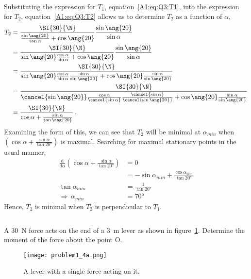 \documentclass[a4paper,justified,oneside]{tufte-handout}
\numberwithin{equation}{subsection}
\begin{document}
\begin{solution}
Substituting the expression for $T_1$, equation~\ref{A1:eq:Q3:T1}, into the expression for $T_2$, equation~\ref{A1:eq:Q3:T2} allows us to determine $T_2$ as a function of $\alpha$,
\begin{align}
	T_2	&=\frac{\SI{30}{\N}}{\frac{\sin\ang{20}}{\tan\alpha} + \cos\ang{20}}	\frac{\sin\ang{20}}{\sin\alpha}	\nonumber	\\
		&=\frac{\SI{30}{\N}}	{\sin\ang{20}\frac{\cos\alpha}{\sin\alpha} + \cos\ang{20}}	\frac{\sin\ang{20}}{\sin\alpha}	\nonumber \\
		&=\frac{\SI{30}{\N}}	{\sin\ang{20}\frac{\cos\alpha}{\sin\alpha}\frac{\sin\alpha}{\sin\ang{20}} + \cos\ang{20}\frac{\sin\alpha}{\sin\ang{20}}}	\nonumber \\
		&=\frac{\SI{30}{\N}}	{\cancel{\sin\ang{20}}	\frac{\cos\alpha}	{\cancel{\sin\alpha}}	\frac{\cancel{\sin\alpha}}{\cancel{\sin\ang{20}}} + \cos\ang{20}\frac{\sin\alpha}{\sin\ang{20}}}	\nonumber \\
		&=\frac{\SI{30}{\N}}{\cos\alpha + \frac{\sin\alpha}{\tan\ang{20}}} \,.
\end{align}
Examining the form of this, we can see that $T_2$ will be minimal at $\alpha_{min}$ when $\left(\cos\alpha + \frac{\sin\alpha}{\tan\ang{20}}\right)$ is maximal. Searching for maximal stationary points in the usual manner,
\begin{align}
	\frac{\mathrm{d}}{\mathrm{d}\alpha} \left(\cos\alpha + \frac{\sin\alpha}{\tan\ang{20}}\right)	&=	0	\nonumber\\
		&=	-\sin\alpha_{min} +\frac{\cos\alpha_{min}}{\tan\ang{20}}	\nonumber	\\
		\tan\alpha_{min}	&=	\frac{1}{\tan\ang{20}}	\label{A1:eq:Q3:alpha}\\
		\Rightarrow\,\alpha_{min} &= \ang{70} \nonumber
\end{align}
Hence, $T_2$ is minimal when $T_2$ is perpendicular to $T_1$.
\clearpage
\end{solution}

\subsection{}
A \SI{30}{\N} force acts on the end of a \SI{3}{\m} lever as shown in figure~\ref{A1:fig:Q4a}. Determine the moment of the force about the point O.
\begin{figure}
	\centering
	\texttt{[image: problem1\_4a.png]}
	\caption{A lever with a single force acting on it.}
	\label{A1:fig:Q4a}
\end{figure}
\end{document}
